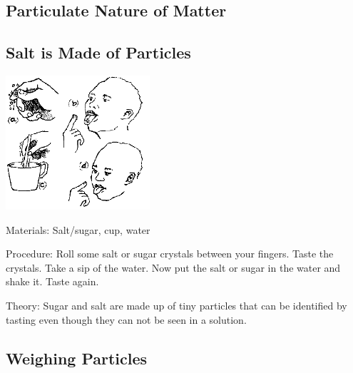 \begin{multicols}{2}
\columnbreak


\section*{Particulate Nature of Matter}


\subsection{Salt is Made of Particles}

\begin{center}
\includegraphics[width=0.4\textwidth]{./img/source/salt-particles.png}
\end{center}

\begin{description*}
\item[Materials:]{Salt/sugar, cup, water}
\item[Procedure:]{Roll some salt or sugar crystals between your fingers. Taste the crystals. Take a sip of the water. Now put the salt or sugar in the water and shake it. Taste again.}
\item[Theory:]{Sugar and salt are made up of tiny particles that can be identified by tasting even though they can not be seen in a solution.}
\end{description*}

\subsection{Weighing Particles}


\end{multicols}
